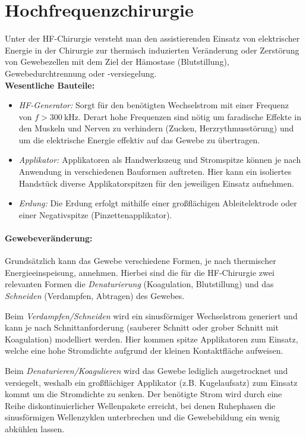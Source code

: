 \documentclass[letterpaper,12pt]{article}
\begin{document}
	
		\section*{Hochfrequenzchirurgie}
		
		Unter der HF-Chirurgie versteht man den assistierenden Einsatz von elektrischer Energie in der Chirurgie zur thermisch induzierten Veränderung oder Zerstörung von Gewebezellen mit dem Ziel der Hämostase (Blutstillung), Gewebedurchtrennung oder -versiegelung.\\
		
		\textbf{Wesentliche Bauteile:}
		\begin{itemize}
			\item \emph{HF-Generator:} Sorgt für den benötigten Wechselstrom mit einer Frequenz von $f>\SI{300}{\kilo\hertz}$. Derart hohe Frequenzen sind nötig um faradische Effekte in den Muskeln und Nerven zu verhindern (Zucken, Herzrythmusstörung) und um die elektrische Energie effektiv auf das Gewebe zu übertragen.
			\item \emph{Applikator:} Applikatoren als Handwerkszeug und Stromspitze können je nach Anwendung in verschiedenen Bauformen auftreten. Hier kann ein isoliertes Handstück diverse Applikatorspitzen für den jeweiligen Einsatz aufnehmen.
			\item \emph{Erdung:} Die Erdung erfolgt mithilfe einer großflächigen Ableitelektrode oder einer Negativspitze (Pinzettenapplikator).
		\end{itemize}
		
		\paragraph{Gewebeveränderung:}
		Grundsätzlich kann das Gewebe verschiedene Formen, je nach thermischer Energieeinspeisung, annehmen. Hierbei sind die für die HF-Chirurgie zwei relevanten Formen die \emph{Denaturierung} (Koagulation, Blutstillung) und das \emph{Schneiden} (Verdampfen, Abtragen) des Gewebes. 
		
		Beim \emph{Verdampfen/Schneiden} wird ein sinusförmiger Wechselstrom generiert und kann je nach Schnittanforderung (sauberer Schnitt oder grober Schnitt mit Koagulation) modelliert werden. Hier kommen spitze Applikatoren zum Einsatz, welche eine hohe Stromdichte aufgrund der kleinen Kontaktfläche aufweisen. 
		
		Beim \emph{Denaturieren/Koagulieren} wird das Gewebe lediglich ausgetrocknet und versiegelt, weshalb ein großflächiger Applikator (z.B. Kugelaufsatz) zum Einsatz kommt um die Stromdichte zu senken. Der benötigte Strom wird durch eine Reihe diskontinuierlicher Wellenpakete erreicht, bei denen Ruhephasen die sinusförmigen Wellenzyklen unterbrechen und die Gewebebildung ein wenig abkühlen lassen.\\
		
\end{document}
